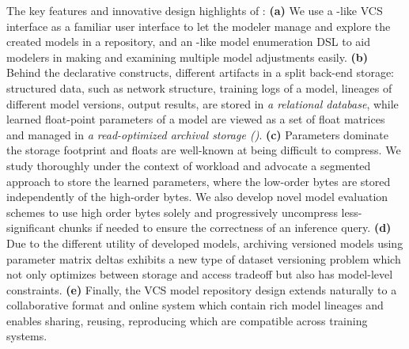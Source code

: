 \documentclass[conference]{IEEEtran}
\begin{document}
The key features and innovative design highlights of \modelhub\are: 
\textbf{(a)} We use a -like VCS interface as a familiar user interface to let the modeler manage and explore the created models in a repository, and an -like model enumeration DSL to aid modelers in making and examining multiple model adjustments easily. 
\textbf{(b)} Behind the declarative constructs, \modelhub\manages different artifacts in a split back-end storage: structured data, such as network structure, training logs of a model, lineages of different model versions, output results, are stored in {\em a relational database}, while learned float-point parameters of a model are viewed as a set of float matrices and managed in {\em a read-optimized archival storage (\weightstore)}. 
\textbf{(c)} Parameters dominate the storage footprint and floats are well-known at being difficult to compress. We study \weightstore\implementation thoroughly under the context of \dnn\query workload and advocate a segmented approach  to store the learned parameters, where the low-order bytes are stored independently of the high-order bytes. We also develop novel model evaluation schemes to use high order bytes solely and progressively uncompress less-significant chunks if needed to ensure the correctness of an inference query. 
\textbf{(d)} Due to the different utility of developed models, archiving versioned models using parameter matrix deltas exhibits a new type of dataset versioning problem which not only optimizes between storage and access tradeoff but also has model-level constraints.
\textbf{(e)} Finally, the VCS model repository design extends naturally to a collaborative format and online system which contain rich model lineages and enables sharing, reusing, reproducing \dnn\models which are compatible across training systems.
\end{document}

